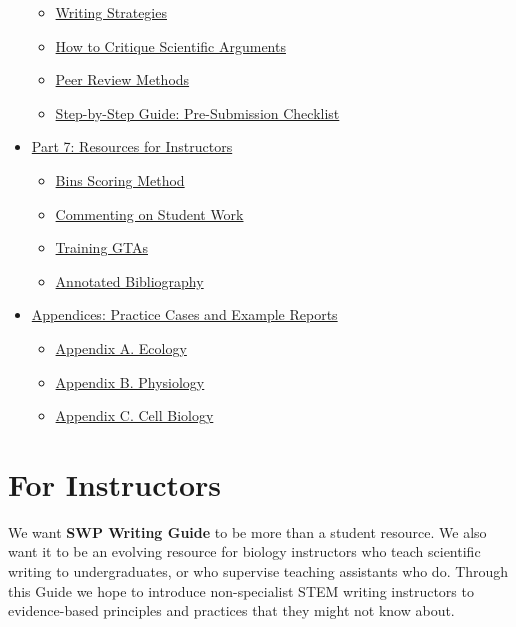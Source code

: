 \documentclass[
]{book}
\providecommand{\tightlist}{%
  \setlength{\itemsep}{0pt}\setlength{\parskip}{0pt}}
\begin{document}
\begin{itemize}
  \begin{itemize}
  \tightlist
  \item
    \protect\hyperlink{strategies610}{Writing Strategies}
  \item
    \protect\hyperlink{toulmin615}{How to Critique Scientific Arguments}
  \item
    \protect\hyperlink{peerreview630}{Peer Review Methods}
  \item
    \protect\hyperlink{submissioncheck650}{Step-by-Step Guide: Pre-Submission Checklist}
  \end{itemize}
\item
  \protect\hyperlink{teachertools700}{Part 7: Resources for Instructors}

  \begin{itemize}
  \tightlist
  \item
    \protect\hyperlink{binsscore705}{Bins Scoring Method}
  \item
    \protect\hyperlink{commenting710}{Commenting on Student Work}
  \item
    \protect\hyperlink{tatraining720}{Training GTAs}
  \item
    \protect\hyperlink{bibliography750}{Annotated Bibliography}
  \end{itemize}
\item
  \protect\hyperlink{appendix800}{Appendices: Practice Cases and Example Reports}

  \begin{itemize}
  \tightlist
  \item
    \protect\hyperlink{appa810}{Appendix A. Ecology}
  \item
    \protect\hyperlink{appb820}{Appendix B. Physiology}
  \item
    \protect\hyperlink{appc830}{Appendix C. Cell Biology}
  \end{itemize}
\end{itemize}

\hypertarget{for-instructors}{%
\chapter*{For Instructors}\label{for-instructors}}

We want \textbf{SWP Writing Guide} to be more than a student resource. We also want it to be an evolving resource for biology instructors who teach scientific writing to undergraduates, or who supervise teaching assistants who do. Through this Guide we hope to introduce non-specialist STEM writing instructors to evidence-based principles and practices that they might not know about.
\end{document}
